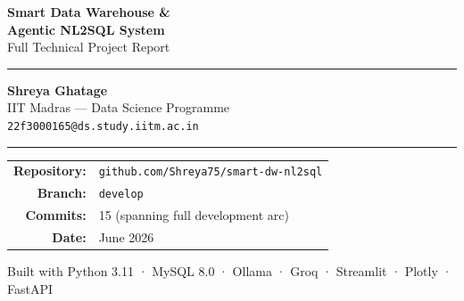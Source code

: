 \documentclass[12pt,a4paper]{report}
\begin{document}
\begin{titlepage}
  \centering
  \vspace*{2cm}
  {\Huge\bfseries\color{AccentBlue}
    Smart Data Warehouse \&\\[6pt]
    Agentic NL2SQL System\\[10pt]}
  {\large\color{AccentCyan} Full Technical Project Report}

  \vspace{1.5cm}
  \rule{0.7\linewidth}{1.5pt}
  \vspace{1cm}


  \vspace{1.5cm}
  {\large\bfseries Shreya Ghatage}\\[4pt]
  {\normalsize\color{SlateDark} IIT Madras — Data Science Programme}\\
  {\normalsize\color{SlateDark} \texttt{22f3000165@ds.study.iitm.ac.in}}

  \vspace{1.2cm}
  \rule{0.4\linewidth}{0.6pt}
  \vspace{0.8cm}

  \begin{tabular}{rl}
    \textbf{Repository:} & \texttt{github.com/Shreya75/smart-dw-nl2sql}\\[4pt]
    \textbf{Branch:}     & \texttt{develop}\\[4pt]
    \textbf{Commits:}    & 15 (spanning full development arc)\\[4pt]
    \textbf{Date:}       & June 2026\\
  \end{tabular}

  \vfill
  {\small\color{SlateDark}
    Built with Python 3.11 · MySQL 8.0 · Ollama · Groq · Streamlit · Plotly · FastAPI}
\end{titlepage}

\end{document}

